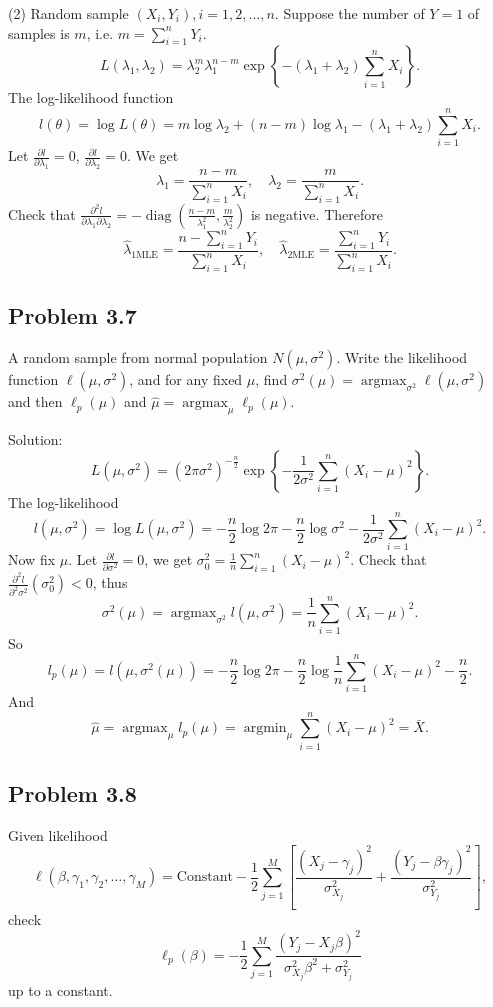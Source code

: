 (2) Random sample $(X_{i},Y_{i}),i=1,2,\ldots,n$. Suppose the number of $Y=1$ of samples is $m$, i.e. $m=\sum_{i=1}^{n}Y_{i}$.
\[
L(\lambda_{1},\lambda_{2})=\lambda_{2}^{m}\lambda_{1}^{n-m}\exp\left\{-\left(\lambda_{1}+\lambda_{2}\right)\sum_{i=1}^{n}X_{i}\right\}.
\]
The log-likelihood function
\[
l(\theta)=\log L(\theta)=m\log\lambda_{2}+(n-m)\log\lambda_{1}-\left(\lambda_{1}+\lambda_{2}\right)\sum_{i=1}^{n}X_{i}.
\]
Let $\frac{\partial l}{\partial\lambda_{1}}=0$, $\frac{\partial l}{\partial\lambda_{2}}=0$. We get
\[
\lambda_{1}=\frac{n-m}{\sum_{i=1}^{n}X_{i}},\quad \lambda_{2}=\frac{m}{\sum_{i=1}^{n}X_{i}}.
\]
Check that $\frac{\partial^{2}l}{\partial\lambda_{1}\partial\lambda_{2}}=-\operatorname{diag}\left(\frac{n-m}{\lambda_{1}^{2}},\frac{m}{\lambda_{2}^{2}}\right)$ is negative. Therefore
\[
\hat{\lambda}_{1\text{MLE}}=\frac{n-\sum_{i=1}^{n}Y_{i}}{\sum_{i=1}^{n}X_{i}},\quad \hat{\lambda}_{2\text{MLE}}=\frac{\sum_{i=1}^{n}Y_{i}}{\sum_{i=1}^{n}X_{i}}.
\]

\subsection*{Problem 3.7}
A random sample from normal population $N\left(\mu,\sigma^{2}\right)$. Write the likelihood function $\ell\left(\mu,\sigma^{2}\right)$, and for any fixed $\mu$, find $\sigma^{2}(\mu)=\operatorname{argmax}_{\sigma^{2}}\ell\left(\mu,\sigma^{2}\right)$ and then $\ell_{p}(\mu)$ and $\hat{\mu}=\operatorname{argmax}_{\mu}\ell_{p}(\mu)$.

{Solution:}
\[
L\left(\mu,\sigma^{2}\right)=\left(2\pi\sigma^{2}\right)^{-\frac{n}{2}}\exp\left\{-\frac{1}{2\sigma^{2}}\sum_{i=1}^{n}(X_{i}-\mu)^{2}\right\}.
\]
The log-likelihood
\[
l\left(\mu,\sigma^{2}\right)=\log L\left(\mu,\sigma^{2}\right)=-\frac{n}{2}\log 2\pi-\frac{n}{2}\log\sigma^{2}-\frac{1}{2\sigma^{2}}\sum_{i=1}^{n}(X_{i}-\mu)^{2}.
\]
Now fix $\mu$. Let $\frac{\partial l}{\partial\sigma^{2}}=0$, we get $\sigma_{0}^{2}=\frac{1}{n}\sum_{i=1}^{n}(X_{i}-\mu)^{2}$. Check that $\frac{\partial^{2}l}{\partial^{2}\sigma^{2}}\left(\sigma_{0}^{2}\right)<0$, thus
\[
\sigma^{2}(\mu)=\operatorname{argmax}_{\sigma^{2}}l\left(\mu,\sigma^{2}\right)=\frac{1}{n}\sum_{i=1}^{n}(X_{i}-\mu)^{2}.
\]
So
\[
l_{p}(\mu)=l\left(\mu,\sigma^{2}(\mu)\right)=-\frac{n}{2}\log 2\pi-\frac{n}{2}\log\frac{1}{n}\sum_{i=1}^{n}(X_{i}-\mu)^{2}-\frac{n}{2}.
\]
And
\[
\hat{\mu}=\operatorname{argmax}_{\mu}l_{p}(\mu)=\operatorname{argmin}_{\mu}\sum_{i=1}^{n}(X_{i}-\mu)^{2}=\bar{X}.
\]

\subsection*{Problem 3.8}
Given likelihood
\[
\ell(\beta,\gamma_{1},\gamma_{2},\ldots,\gamma_{M})=\text{Constant}-\frac{1}{2}\sum_{j=1}^{M}\left[\frac{(X_{j}-\gamma_{j})^{2}}{\sigma_{X_{j}}^{2}}+\frac{(Y_{j}-\beta\gamma_{j})^{2}}{\sigma_{Y_{j}}^{2}}\right],
\]
check
\[
\ell_{p}(\beta)=-\frac{1}{2}\sum_{j=1}^{M}\frac{(Y_{j}-X_{j}\beta)^{2}}{\sigma_{X_{j}}^{2}\beta^{2}+\sigma_{Y_{j}}^{2}}
\]
up to a constant.

